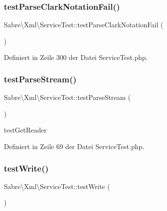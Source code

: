 \subsubsection{\texorpdfstring{test\+Parse\+Clark\+Notation\+Fail()}{testParseClarkNotationFail()}}
{\footnotesize\ttfamily Sabre\textbackslash{}\+Xml\textbackslash{}\+Service\+Test\+::test\+Parse\+Clark\+Notation\+Fail (\begin{DoxyParamCaption}{ }\end{DoxyParamCaption})}



Definiert in Zeile 300 der Datei Service\+Test.\+php.

\mbox{\label{class_sabre_1_1_xml_1_1_service_test_a7bdfb70b67f6ffcbe1a554d1509b5843}} 
\subsubsection{\texorpdfstring{test\+Parse\+Stream()}{testParseStream()}}
{\footnotesize\ttfamily Sabre\textbackslash{}\+Xml\textbackslash{}\+Service\+Test\+::test\+Parse\+Stream (\begin{DoxyParamCaption}{ }\end{DoxyParamCaption})}

test\+Get\+Reader 

Definiert in Zeile 69 der Datei Service\+Test.\+php.

\mbox{\label{class_sabre_1_1_xml_1_1_service_test_aef5fdaf58ddd284ab3adef59edc8cd84}} 
\subsubsection{\texorpdfstring{test\+Write()}{testWrite()}}
{\footnotesize\ttfamily Sabre\textbackslash{}\+Xml\textbackslash{}\+Service\+Test\+::test\+Write (\begin{DoxyParamCaption}{ }\end{DoxyParamCaption})}

